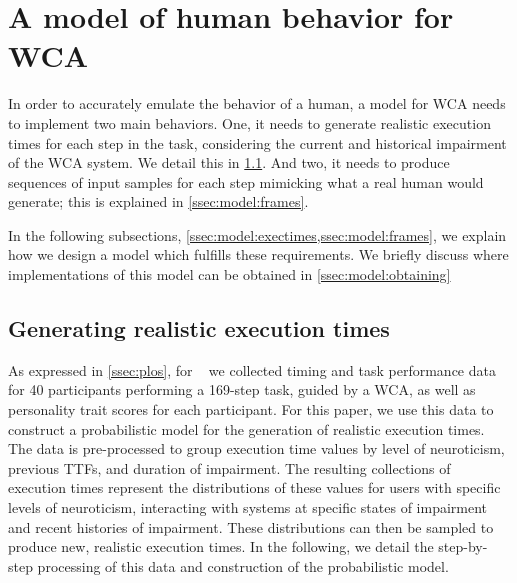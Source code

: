 \section{A model of human behavior for \ac{WCA}}\label{sec:model}


In order to accurately emulate the behavior of a human, a model for \ac{WCA} needs to implement two main behaviors.
One, it needs to generate realistic execution times for each step in the task, considering the current and historical impairment of the \ac{WCA} system.
We detail this in \cref{ssec:model:exectimes}.
And two, it needs to produce sequences of input samples for each step mimicking what a real human would generate; this is explained in \cref{ssec:model:frames}.

In the following subsections, \cref{ssec:model:exectimes,ssec:model:frames}, we explain how we design a model which fulfills these requirements.
We briefly discuss where implementations of this model can be obtained in \cref{ssec:model:obtaining}

\subsection{Generating realistic execution times}\label{ssec:model:exectimes}

As expressed in \cref{ssec:plos}, for ~\cite{olguinmunoz:impact2021} we collected timing and task performance data for \num{40} participants performing a \num{169}-step task, guided by a \ac{WCA}, as well as personality trait scores for each participant.
For this paper, we use this data to construct a probabilistic model for the generation of realistic execution times.
The data is pre-processed to group execution time values by level of neuroticism, previous \acp{TTF}, and duration of impairment.
The resulting collections of execution times represent the distributions of these values for users with specific levels of neuroticism, interacting with systems at specific states of impairment and recent histories of impairment.
These distributions can then be sampled to produce new, realistic execution times.
In the following, we detail the step-by-step processing of this data and construction of the probabilistic model.

